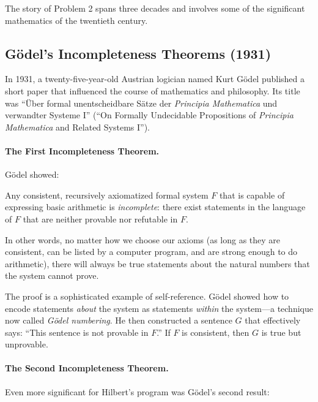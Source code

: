 The story of Problem 2 spans three decades and involves some of the significant mathematics of the twentieth century.

\subsection{G\"odel's Incompleteness Theorems (1931)}

In 1931, a twenty-five-year-old Austrian logician named Kurt G\"odel published a short paper that influenced the course of mathematics and philosophy. Its title was ``\"Uber formal unentscheidbare S\"atze der \emph{Principia Mathematica} und verwandter Systeme I'' (``On Formally Undecidable Propositions of \emph{Principia Mathematica} and Related Systems I'').

\paragraph{The First Incompleteness Theorem.}

G\"odel showed:

\begin{theorem}
\label{thm:godel-first}
Any consistent, recursively axiomatized formal system $F$ that is capable of expressing basic arithmetic is \emph{incomplete}: there exist statements in the language of $F$ that are neither provable nor refutable in $F$.
\end{theorem}

In other words, no matter how we choose our axioms (as long as they are consistent, can be listed by a computer program, and are strong enough to do arithmetic), there will always be true statements about the natural numbers that the system cannot prove.

The proof is a sophisticated example of self-reference. G\"odel showed how to encode statements \emph{about} the system as statements \emph{within} the system---a technique now called \emph{G\"odel numbering}. He then constructed a sentence $G$ that effectively says: ``This sentence is not provable in $F$.'' If $F$ is consistent, then $G$ is true but unprovable.

\paragraph{The Second Incompleteness Theorem.}

Even more significant for Hilbert's program was G\"odel's second result:

